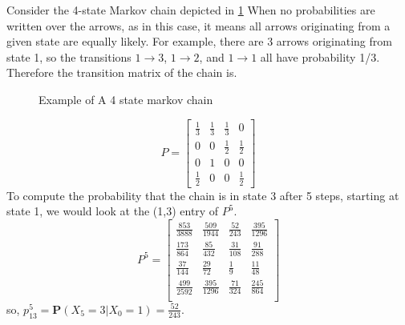 \begin{example}
    Consider the 4-state
    Markov chain depicted in \cref{4 step transition matrix example} When no probabilities are written over the
    arrows, as in this case, it means all arrows originating from a given state are equally
    likely. For example, there are 3 arrows originating from state 1, so the transitions
    $1 \to 3$, $1 \to 2$, and $1 \to 1$ all have probability 1/3. Therefore the transition matrix of the chain is.

    \begin{figure}[ht]
        \centering
        \caption{Example of A 4 state markov chain}
        \label{4 step transition matrix example}
    \end{figure}

    \[
        P=
        \begin{bmatrix}
            \frac{1}{3} & \frac{1}{3} & \frac{1}{3} & 0 \\
            0 & 0 & \frac{1}{2} & \frac{1}{2} \\ 
            0 & 1 & 0 & 0 \\ 
            \frac{1}{2} & 0 & 0 & \frac{1}{2} 
        \end{bmatrix}
    \]
    To compute the probability that the chain is in state 3 after 5 steps, starting at
    state 1, we would look at the (1,3) entry of $ P^{5} $.
    \[
        P^5 =
        \begin{bmatrix}
            \frac{853}{3888} & \frac{509}{1944} & \frac{52}{243} & \frac{395}{1296} \\
            \frac{173}{864} & \frac{85}{432} & \frac{31}{108} & \frac{91}{288} \\
            \frac{37}{144} & \frac{29}{72} & \frac{1}{9} & \frac{11}{48} \\
            \frac{499}{2592} & \frac{395}{1296} & \frac{71}{324} & \frac{245}{864} \\
        \end{bmatrix}
    \]
    so, $ p^{5}_{13}=\mathbf{P}(X_{5}=3|X_{0}=1) = \frac{52}{243} $.
\end{example}

